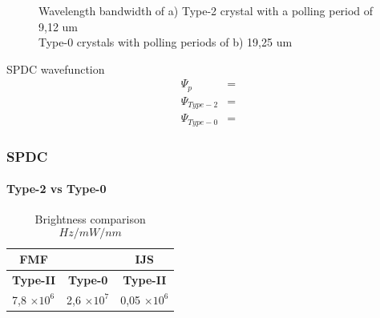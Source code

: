 \documentclass[serif,8pt]{beamer}
\begin{document}
{{\begin{frame}[t]
	\begin{figure}[!ht]
	  \centering
	  \caption{Wavelength bandwidth of a) Type-2 crystal with a polling period of 9,12 um\\ Type-0 crystals with polling periods of b) 19,25 um}
	  \quad
	  \pause
	  \label{fig:CompT0a2}
	\end{figure}
	\pause
	\begin{block}{SPDC wavefunction}
		\begin{equation}
		\begin{align*}
			\Psi_{p} &= \\
			\Psi_{Type-2} &= \\
			\Psi_{Type-0} &= 
		\end{align*}
		\label{eq:Psi2n0}
	\end{equation}
	\end{block}
\end{frame}

\begin{frame}
	\frametitle{SPDC}
	\framesubtitle{Type-2 vs Type-0}

	\begin{table}
		\begin{center}
		\caption{Brightness comparison \[Hz/mW/nm\]}
			\begin{tabular}[c|c|c]{|ll|l|}
				\hline
				\multicolumn{1}{|c}{\textbf{FMF}} & & 
				\multicolumn{1}{c|}{\textbf{IJS}} \\
				\hline 
				\multicolumn{1}{|c|}{\textbf{Type-II}} &
				\multicolumn{1}{c|}{\textbf{Type-0}} &
				\multicolumn{1}{c|}{\textbf{Type-II}} \\
				\hline
				7,8 $\times10^6$ & 2,6 $\times 10^7 $ & 0,05 $\times 10^6$ \\
				\hline
			\end{tabular}
		\end{center}
	\end{table}
\end{frame}

}}
\end{document}
